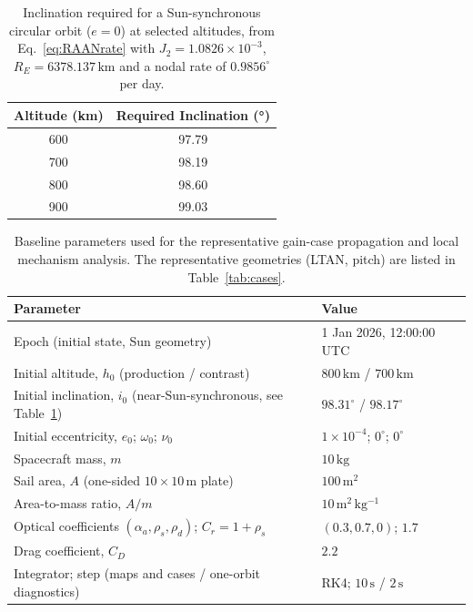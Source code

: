 \begin{table}[htbp]
\centering
\caption{Inclination required for a Sun-synchronous circular orbit (\(e = 0\)) at selected altitudes, from Eq.~\eqref{eq:RAANrate} with \(J_2 = 1.0826\times10^{-3}\), \(R_E = 6378.137\,\mathrm{km}\) and a nodal rate of \(0.9856^\circ\) per day.}\label{tab:sso_inclinations}
\vspace{1em}
\begin{tabular}{c|c}
\textbf{Altitude (km)} & \textbf{Required Inclination (°)} \\
\hline
600 & 97.79 \\
700 & 98.19 \\
800 & 98.60 \\
900 & 99.03 \\
\end{tabular}

\end{table}


\begin{table}[htbp]
\centering
\caption{Baseline parameters used for the representative gain-case propagation and local mechanism analysis. The representative geometries (LTAN, pitch) are listed in Table~\ref{tab:cases}.}
\label{tab:baseline_params}
\vspace{0.5em}
\small
\begin{tabular}{p{8.0cm} p{4.4cm}}
\hline
\textbf{Parameter} & \textbf{Value} \\
\hline
Epoch (initial state, Sun geometry) & 1 Jan 2026, 12:00:00 UTC \\
Initial altitude, \(h_0\) (production / contrast) & \(800\,\mathrm{km}\) / \(700\,\mathrm{km}\) \\
Initial inclination, \(i_0\) (near-Sun-synchronous, see Table~\ref{tab:sso_inclinations}) & \(98.31^\circ\) / \(98.17^\circ\) \\
Initial eccentricity, \(e_0\); \(\omega_0\); \(\nu_0\) & \(1\times10^{-4}\); \(0^\circ\); \(0^\circ\) \\
Spacecraft mass, \(m\) & \(10\,\mathrm{kg}\) \\
Sail area, \(A\) (one-sided \(10\times10\,\mathrm{m}\) plate) & \(100\,\mathrm{m^2}\) \\
Area-to-mass ratio, \(A/m\) & \(10\,\mathrm{m^2\,kg^{-1}}\) \\
Optical coefficients \((\alpha_a,\rho_s,\rho_d)\); \(C_r = 1+\rho_s\) & \((0.3, 0.7, 0)\); \(1.7\) \\
Drag coefficient, \(C_D\) & \(2.2\) \\
Integrator; step (maps and cases / one-orbit diagnostics) & RK4; \(10\,\mathrm{s}\) / \(2\,\mathrm{s}\) \\
\hline
\end{tabular}
\end{table}

